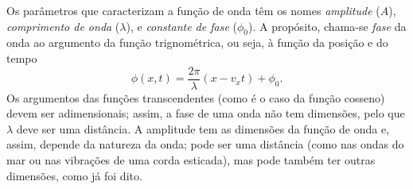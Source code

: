 Os parâmetros que caracterizam a função de onda têm os nomes
\emph{amplitude} ($A$), \emph{comprimento de onda} ($\lambda$), e
\emph{constante de fase} ($\phi_0$). A propósito, chama-se \emph{fase} da onda
ao argumento da função trignométrica, ou seja, à função da posição e do tempo
\begin{equation}\label{eq:harmonicphase}
\phi(x,t)=\frac{2\pi}{\lambda}(x-v_xt)+\phi_0.
\end{equation}
Os argumentos das funções transcendentes (como é o caso da função cosseno) devem
ser adimensionais; assim, a fase de uma onda não tem dimensões, pelo que
$\lambda$ deve ser uma distância.  A amplitude tem as dimensões da função de
onda e, assim, depende da natureza da onda; pode ser uma distância (como nas
ondas do mar ou nas vibrações de uma corda esticada), mas pode também ter outras
dimensões, como já foi dito.

